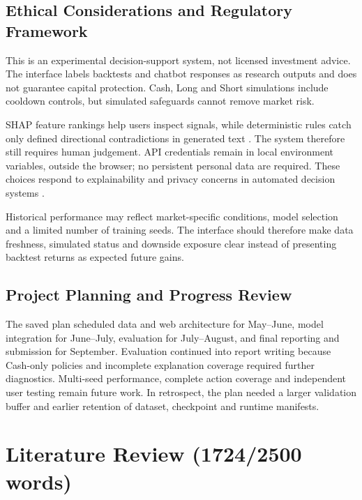 \documentclass[11pt,a4paper]{article}
\begin{document}
\subsection{Ethical Considerations and Regulatory Framework}
This is an experimental decision-support system, not licensed investment advice. The interface labels backtests and chatbot responses as research outputs and does not guarantee capital protection. Cash, Long and Short simulations include cooldown controls, but simulated safeguards cannot remove market risk.

SHAP feature rankings help users inspect signals, while deterministic rules catch only defined directional contradictions in generated text \cite{lundberg2017,arrieta2020}. The system therefore still requires human judgement. API credentials remain in local environment variables, outside the browser; no persistent personal data are required. These choices respond to explainability and privacy concerns in automated decision systems \cite{gdpr2016}.

Historical performance may reflect market-specific conditions, model selection and a limited number of training seeds. The interface should therefore make data freshness, simulated status and downside exposure clear instead of presenting backtest returns as expected future gains.

\newpage

\subsection{Project Planning and Progress Review}
The saved plan scheduled data and web architecture for May--June, model integration for June--July, evaluation for July--August, and final reporting and submission for September. Evaluation continued into report writing because Cash-only policies and incomplete explanation coverage required further diagnostics. Multi-seed performance, complete action coverage and independent user testing remain future work. In retrospect, the plan needed a larger validation buffer and earlier retention of dataset, checkpoint and runtime manifests.

\newpage

\section{Literature Review (1724/2500 words)}
\end{document}
